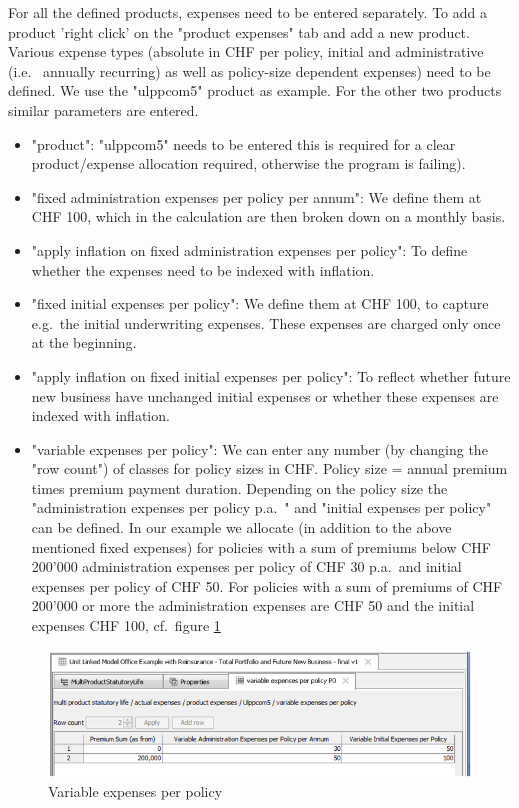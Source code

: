 For all the defined products, expenses need to be entered separately. To add a product 'right click' on the "product expenses" tab and add a new product. Various expense types (absolute in CHF per policy, initial and administrative (i.e.~ annually recurring) as well as policy-size dependent expenses) need to be defined. We use the "ulppcom5" product as example. For the other two products similar parameters are entered.
\begin{itemize}
	\item "product": "ulppcom5" needs to be entered this is required for a clear product/expense allocation required, otherwise the program is failing).
	\item "fixed administration expenses per policy per annum": We define them at CHF 100, which in the calculation are then broken down on a monthly basis.
	\item "apply inflation on fixed administration expenses per policy": To define whether the expenses need to be indexed with inflation.
	\item "fixed initial expenses per policy": We define them at CHF 100, to capture e.g.~the initial underwriting expenses. These expenses are charged only once at the beginning.
	\item "apply inflation on fixed initial expenses per policy": To reflect whether future new business have unchanged initial expenses or whether these expenses are indexed with inflation.
	\item "variable expenses per policy": We can enter any number (by changing the "row count") of classes for policy sizes in CHF. Policy size = annual premium times premium payment duration. Depending on the policy size the "administration expenses per policy p.a.~" and "initial expenses per policy" can be defined. In our example we allocate (in addition to the above mentioned fixed expenses) for policies with a sum of premiums below CHF 200'000 administration expenses per policy of CHF 30 p.a.~and initial expenses per policy of CHF 50. For policies with a sum of premiums of CHF 200'000 or more the administration expenses are CHF 50 and the initial expenses CHF 100, cf.~figure \ref{fig:variableexpenses}\end{itemize}

\begin{figure}
\includegraphics[scale=0.7]{images/variableexpenses.png}
	\caption{Variable expenses per policy}
	\label{fig:variableexpenses}
\end{figure}

